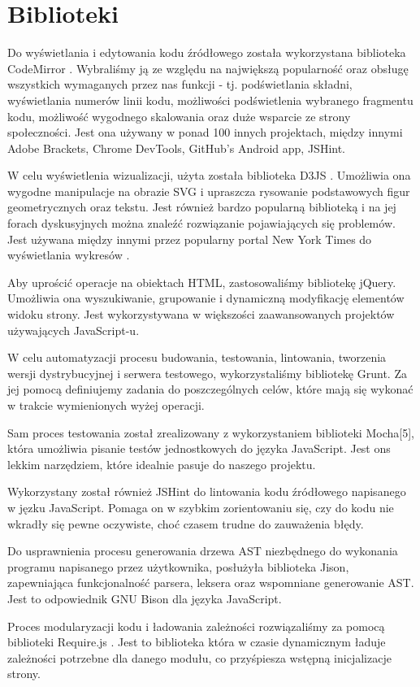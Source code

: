 \documentclass[a4paper,twoside,openright,11pt]{report}
\begin{document}
  \section{Biblioteki}
\par Do wyświetlania i edytowania kodu źródłowego została wykorzystana biblioteka CodeMirror \cite{cm}. Wybraliśmy ją ze względu na największą popularność oraz obsługę wszystkich wymaganych przez nas funkcji - tj. podświetlania składni, wyświetlania numerów linii kodu, możliwości podświetlenia wybranego fragmentu kodu, możliwość wygodnego skalowania oraz duże wsparcie ze strony społeczności. Jest ona używany w ponad 100 innych projektach, między innymi Adobe Brackets, Chrome DevTools, GitHub's Android app, JSHint. \cite{jshint}
\par W celu wyświetlenia wizualizacji, użyta została biblioteka D3JS \cite{d3js}. Umożliwia ona wygodne manipulacje na obrazie SVG i upraszcza rysowanie podstawowych figur geometrycznych oraz tekstu. Jest również bardzo popularną biblioteką i na jej forach dyskusyjnych można znaleźć rozwiązanie pojawiających się problemów. Jest używana między innymi przez popularny portal New York Times do wyświetlania wykresów \cite{ny}.
\par Aby uprościć operacje na obiektach HTML, zastosowaliśmy bibliotekę jQuery. \cite{jquery} Umożliwia ona wyszukiwanie, grupowanie i dynamiczną modyfikację elementów widoku strony. Jest wykorzystywana w większości zaawansowanych projektów używających JavaScript-u.
\par W celu automatyzacji procesu budowania, testowania, lintowania, tworzenia wersji dystrybucyjnej i serwera testowego, wykorzystaliśmy bibliotekę Grunt.\cite{gruntjs} Za jej pomocą definiujemy zadania do poszczególnych celów, które mają się wykonać w trakcie wymienionych wyżej operacji. 
\par Sam proces testowania został zrealizowany z wykorzystaniem biblioteki Mocha[5], która umożliwia pisanie testów jednostkowych do języka JavaScript. Jest ons lekkim narzędziem, które idealnie pasuje do naszego projektu.
\par Wykorzystany został również JSHint\cite{jshint} do lintowania kodu źródłowego napisanego w jęzku JavaScript. Pomaga on w szybkim zorientowaniu się, czy do kodu nie wkradły się pewne oczywiste, choć czasem trudne do zauważenia błędy.
\par Do usprawnienia procesu generowania drzewa AST niezbędnego do wykonania programu napisanego przez użytkownika, posłużyła biblioteka Jison\cite{jison}, zapewniająca funkcjonalność parsera, leksera oraz wspomniane generowanie AST. Jest to odpowiednik GNU Bison dla języka JavaScript.
\par Proces modularyzacji kodu i ładowania zależności rozwiązaliśmy za pomocą biblioteki Require.js \cite{requirejs}. Jest to biblioteka która w czasie dynamicznym ładuje zależności potrzebne dla danego modułu, co przyśpiesza wstępną inicjalizacje strony. 
\end{document}
